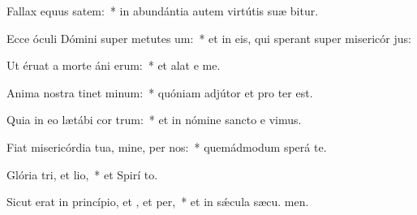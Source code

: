 \item Fallax equus  satem:~* in abundántia autem virtútis suæ  bitur.
\item Ecce óculi Dómini super metutes um:~* et in eis, qui sperant super misericór jus:
\item Ut éruat a morte áni erum:~* et alat e  me.
\item Anima nostra tinet minum:~* quóniam adjútor et pro ter est.
\item Quia in eo lætábi cor trum:~* et in nómine sancto e vimus.
\item Fiat misericórdia tua, mine, per nos:~* quemádmodum sperá  te.
\item Glória tri, et lio,~* et Spirí to.
\item Sicut erat in princípio, et , et per,~* et in sǽcula sæcu. men.
